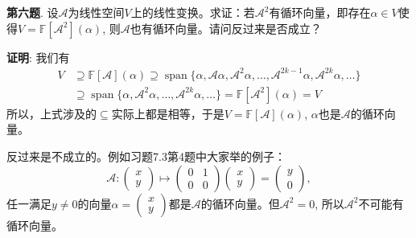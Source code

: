 \newpageorvspace


{\bf 第六题}. 设$\mathscr{A}$为线性空间$V$上的线性变换。求证：若$\mathscr{A}^2$有循环向量，即存在$\alpha\in V$使得$V = \mathbb{F}[\mathscr{A}^2](\alpha)$, 则$\mathscr{A}$也有循环向量。请问反过来是否成立？

\newpageorvspace

{\bf 证明}: 我们有
\begin{align*}
V & \supseteq \mathbb{F}[\mathscr{A}](\alpha) \supseteq \operatorname{span} \{ \alpha, \mathscr{A}\alpha, \mathscr{A}^2\alpha, \ldots, \mathscr{A}^{2k-1}\alpha, \mathscr{A}^{2k}\alpha, \ldots \} \\
& \supseteq \operatorname{span} \{ \alpha, \mathscr{A}^2\alpha, \ldots, \mathscr{A}^{2k}\alpha, \ldots \} = \mathbb{F}[\mathscr{A}^2](\alpha) = V
\end{align*}
所以，上式涉及的$\subseteq$实际上都是相等，于是$V = \mathbb{F}[\mathscr{A}](\alpha)$, $\alpha$也是$\mathscr{A}$的循环向量。

反过来是不成立的。例如习题7.3第4题中大家举的例子：
$$\mathscr{A}: \begin{pmatrix} x \\ y \end{pmatrix} \mapsto \begin{pmatrix} 0 & 1 \\ 0 & 0 \end{pmatrix} \begin{pmatrix} x \\ y \end{pmatrix} = \begin{pmatrix} y \\ 0 \end{pmatrix},$$
任一满足$y \neq 0$的向量$\alpha = \begin{pmatrix} x \\ y \end{pmatrix}$都是$\mathscr{A}$的循环向量。但$\mathscr{A}^2 = 0$, 所以$\mathscr{A}^2$不可能有循环向量。



